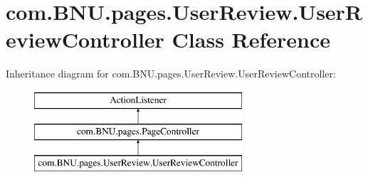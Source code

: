 \hypertarget{classcom_1_1_b_n_u_1_1pages_1_1_user_review_1_1_user_review_controller}{}\section{com.\+B\+N\+U.\+pages.\+User\+Review.\+User\+Review\+Controller Class Reference}
\label{classcom_1_1_b_n_u_1_1pages_1_1_user_review_1_1_user_review_controller}
Inheritance diagram for com.\+B\+N\+U.\+pages.\+User\+Review.\+User\+Review\+Controller\+:\begin{figure}[H]
\begin{center}
\leavevmode
\includegraphics[height=3.000000cm]{classcom_1_1_b_n_u_1_1pages_1_1_user_review_1_1_user_review_controller}
\end{center}
\end{figure}
